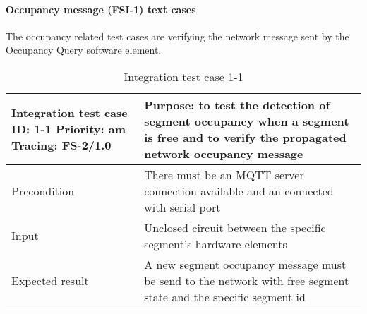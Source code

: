 \paragraph{Occupancy message (FSI-1) text cases} The occupancy related test cases are verifying the network message sent by the Occupancy Query software element.
\begin{table}[H]
	\caption{Integration test case 1-1}
	\label{table:TCase-FSI1-01}
	\begin{center}
		\renewcommand{\arraystretch}{1.8}
		\begin{tabu} 
			to 0.9 \textwidth
			{  X[0.4, c] X[c] }
			\toprule
			Integration test case ID: 1-1 \newline Priority: am \newline Tracing: FS-2/1.0 & Purpose: to test the detection of segment occupancy when a segment is free and to verify the propagated network occupancy message \\ \midrule
			Precondition                                                                   & There must be an MQTT server connection available and an connected with serial port                                               \\
			Input                                                                          & Unclosed circuit between the specific segment's hardware elements                                                                 \\
			Expected result                                                                & A new segment occupancy message must be send to the network with free segment state  and the specific segment id                          \\ \bottomrule
		\end{tabu}
	\end{center}
\end{table} 


